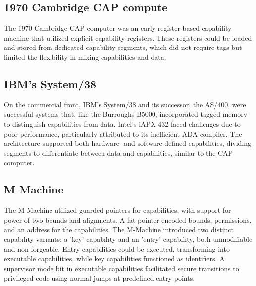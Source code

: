 
\subsection{1970 Cambridge CAP compute}
The 1970 Cambridge CAP computer\cite{wilkes_cambridge_1979} was an early register-based capability machine that utilized explicit 
capability registers. These registers could be loaded and stored from dedicated capability 
segments, which did not require tags but limited the flexibility in mixing capabilities and data.
\newline

\subsection{IBM's System/38}
On the commercial front, IBM's System/38 and its successor, the AS/400, were successful 
systems that, like the Burroughs B5000, incorporated tagged memory to distinguish 
capabilities from data. Intel's iAPX 432 faced challenges due to poor performance, 
particularly attributed to its inefficient ADA compiler. The architecture supported 
both hardware- and software-defined capabilities, dividing segments to differentiate 
between data and capabilities, similar to the CAP computer.
\newline

\subsection{M-Machine}
The M-Machine\cite{fillo_mmachine_nodate} utilized guarded pointers for capabilities, with support for 
power-of-two bounds and alignments. A fat pointer encoded bounds, permissions, 
and an address for the capabilities. The M-Machine introduced two distinct 
capability variants: a 'key' capability and an 'entry' capability, both 
unmodifiable and non-forgeable. Entry capabilities could be executed, 
transforming into executable capabilities, while key capabilities 
functioned as identifiers. A supervisor mode bit in executable capabilities 
facilitated secure transitions to privileged code using normal jumps at predefined entry points.
\newline

